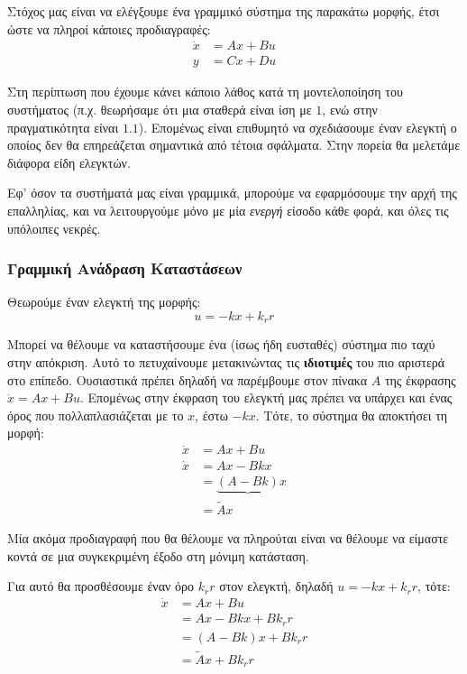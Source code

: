 \documentclass[11pt,a4paper,notitlepage,fleqn]{article}
\begin{document}
Στόχος μας είναι να ελέγξουμε ένα γραμμικό σύστημα της παρακάτω μορφής,
έτσι ώστε να πληροί κάποιες προδιαγραφές:
\begin{align*}
	\dot x &= Ax + Bu\\
	y &= Cx + Du
\end{align*}

Στη περίπτωση που έχουμε κάνει κάποιο λάθος κατά τη μοντελοποίηση του συστήματος
(π.χ. θεωρήσαμε ότι μια σταθερά είναι ίση με \( 1 \), ενώ στην πραγματικότητα
είναι \( 1.1 \)). Επομένως είναι επιθυμητό να σχεδιάσουμε έναν ελεγκτή ο οποίος
δεν θα επηρεάζεται σημαντικά από τέτοια σφάλματα. Στην πορεία θα
μελετάμε διάφορα είδη ελεγκτών.

Εφ' όσον τα συστήματά μας είναι γραμμικά, μπορούμε να εφαρμόσουμε την αρχή της
επαλληλίας, και να λειτουργούμε μόνο με μία \textit{ενεργή} είσοδο κάθε φορά, και όλες τις
υπόλοιπες νεκρές.

\subsubsection{Γραμμική Ανάδραση Καταστάσεων}

Θεωρούμε έναν ελεγκτή της μορφής:
\[
u = -kx + k_r r
\]

Μπορεί να θέλουμε να καταστήσουμε ένα (ίσως ήδη ευσταθές) σύστημα πιο
ταχύ στην απόκριση. Αυτό το πετυχαίνουμε μετακινώντας τις \textbf{ιδιοτιμές} του πιο αριστερά στο επίπεδο. Ουσιαστικά πρέπει δηλαδή να παρέμβουμε στον πίνακα \( Α \) της έκφρασης \( \dot x = Ax+Bu \). Επομένως
στην έκφραση του ελεγκτή μας πρέπει να υπάρχει και ένας όρος που πολλαπλασιάζεται
με το \( x \), έστω \( -kx \). Τότε, το σύστημα θα αποκτήσει τη μορφή:
\begin{align*}
	\dot x &= Ax + Bu \\
	\dot x &= Ax - Bkx \\
	&= \underbrace{(A-Bk)}x \\
	&= \tilde A x
\end{align*}

Μία ακόμα προδιαγραφή που θα θέλουμε να πληρούται είναι να θέλουμε να είμαστε κοντά σε μια συγκεκριμένη έξοδο στη μόνιμη κατάσταση.

Για αυτό θα προσθέσουμε έναν όρο \( k_r r \) στον ελεγκτή, δηλαδή
\( u = -kx+k_r r \), τότε:
\begin{align*}
\dot x &= Ax + Bu \\
&= Ax - Bkx + Bk_r r\\
&= (A-Bk)x + Bk_r r\\
&= \tilde Ax + Bk_r r
\end{align*}
\end{document}
